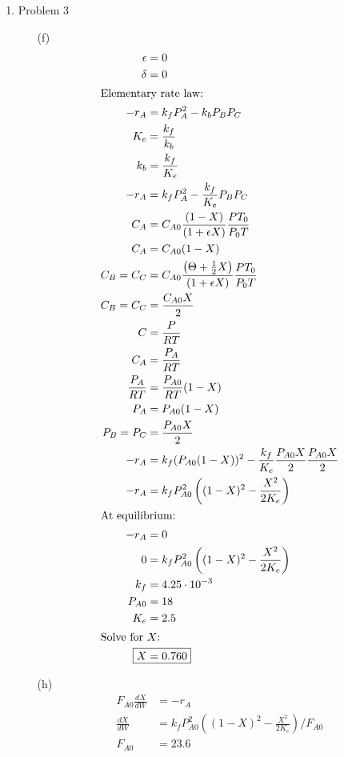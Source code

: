 \documentclass[12pt]{article}
\begin{document}
\begin{enumerate}
\newpage
    \item Problem 3
    \begin{enumerate}
        \item[(f)] 
        \begin{align*}
            \epsilon &= 0 \\
            \delta &= 0 \\
            \intertext{Elementary rate law:}
            -r_A &= k_f P_A^2 - k_b P_B P_C \\
            K_e &= \frac{k_f}{k_b} \\
            k_b &= \frac{k_f}{K_e} \\
            -r_A &= k_f P_A^2 - \frac{k_f}{K_e} P_B P_C \\
            C_A &= C_{A0} \frac{(1 - X)}{(1 + \epsilon X)} \frac{P T_0}{P_0 T} \\
            C_A &= C_{A0} (1 - X) \\
            C_B = C_C &= C_{A0} \frac{\left(\Theta + \frac{1}{2} X\right)}{(1 + \epsilon X)} \frac{P T_0}{P_0 T} \\
            C_B = C_C &= \frac{C_{A0} X}{2} \\
            C &= \frac{P}{RT} \\
            C_A &= \frac{P_A}{RT} \\
            \frac{P_A}{RT} &= \frac{P_{A0}}{RT} (1 - X) \\
            P_A &= P_{A0} (1 - X) \\
            P_B = P_C &= \frac{P_{A0} X}{2} \\
            -r_A &= k_f (P_{A0} (1 - X))^2 - \frac{k_f}{K_e} \frac{P_{A0} X}{2} \frac{P_{A0} X}{2} \\
            -r_A &= k_f P_{A0}^2 \left( (1 - X)^2 - \frac{X^2}{2 K_e} \right) \\
            \intertext{At equilibrium:}
            -r_A &= 0 \\
            0 &= k_f P_{A0}^2 \left( (1 - X)^2 - \frac{X^2}{2 K_e} \right) \\
            k_f &= 4.25 \cdot 10^{-3} \\
            P_{A0} &= 18 \\
            K_e &= 2.5 \\
            \intertext{Solve for $X$:}
            \Aboxed{X &= 0.760} 
        \end{align*}

        \item[(h)]
        \begin{align*}
            F_{A0} \frac{dX}{dW} &= -r_A \\
            \frac{dX}{dW} &= k_f P_{A0}^2 \left( (1 - X)^2 - \frac{X^2}{2 K_e} \right) / F_{A0} \\
            F_{A0} &= 23.6
        \end{align*}


\end{enumerate}
\end{enumerate}
\end{document}
